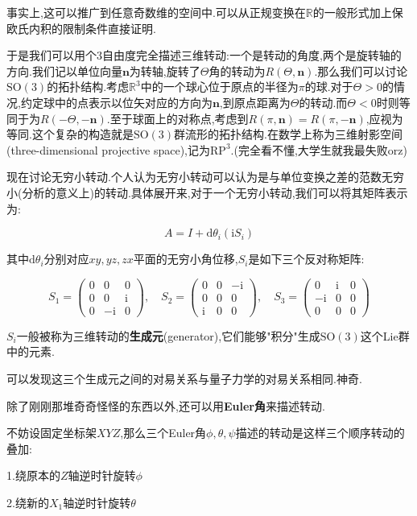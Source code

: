 \documentclass[UTF8]{article}
\newcommand{\D}{\mathrm{d}}
\newcommand{\im}{\mathrm{i}}
\begin{document}
	事实上,这可以推广到任意奇数维的空间中.可以从正规变换在$\mathbb{R}$的一般形式加上保欧氏内积的限制条件直接证明.
	
	于是我们可以用个3自由度完全描述三维转动:一个是转动的角度,两个是旋转轴的方向.我们记以单位向量$\boldsymbol{n}$为转轴,旋转了$\Theta$角的转动为$R(\Theta,\boldsymbol{n})$.那么我们可以讨论$\mathrm{SO(3)}$的拓扑结构.考虑$\mathbb{R}^3$中的一个球心位于原点的半径为$\pi$的球.对于$\Theta>0$的情况,约定球中的点表示以位矢对应的方向为$\boldsymbol{n}$,到原点距离为$\Theta$的转动.而$\Theta<0$时则等同于为$R(-\Theta,-\boldsymbol{n})$.至于球面上的对称点,考虑到$R(\pi,\boldsymbol{n})=R(\pi,-\boldsymbol{n})$,应视为等同.这个复杂的构造就是$\mathrm{SO(3)}$群流形的拓扑结构.在数学上称为三维射影空间(three-dimensional projective space),记为$\mathrm{RP^3}$.(完全看不懂,大学生就我最失败orz)
	
	现在讨论无穷小转动.个人认为无穷小转动可以认为是与单位变换之差的范数无穷小(分析的意义上)的转动.具体展开来,对于一个无穷小转动,我们可以将其矩阵表示为:
	
	\[A=I+\D\theta_i(\im S_i)\]
	
	其中$\D\theta_i$分别对应$xy,yz,zx$平面的无穷小角位移,$S_i$是如下三个反对称矩阵:
	
	\[
	S_1=
	\begin{pmatrix}
		0&0&0\\
		0&0&\im\\
		0&-\im&0
	\end{pmatrix}
	,\quad S_2=
	\begin{pmatrix}
		0&0&-\im\\
		0&0&0\\
		\im&0&0
	\end{pmatrix}
	,\quad S_3=
	\begin{pmatrix}
		0&\im&0\\
		-\im&0&0\\
		0&0&0
	\end{pmatrix}
	\]
	
	$S_i$一般被称为三维转动的\textbf{生成元}(generator),它们能够"积分"生成$\mathrm{SO(3)}$这个Lie群中的元素.
	
	可以发现这三个生成元之间的对易关系与量子力学的对易关系相同.神奇.
	
	除了刚刚那堆奇奇怪怪的东西以外,还可以用\textbf{Euler角}来描述转动.
	
	不妨设固定坐标架$XYZ$,那么三个Euler角$\phi,\theta,\psi$描述的转动是这样三个顺序转动的叠加:
	
	1.绕原本的$Z$轴逆时针旋转$\phi$
	
	2.绕新的$X_1$轴逆时针旋转$\theta$
	
\end{document}
